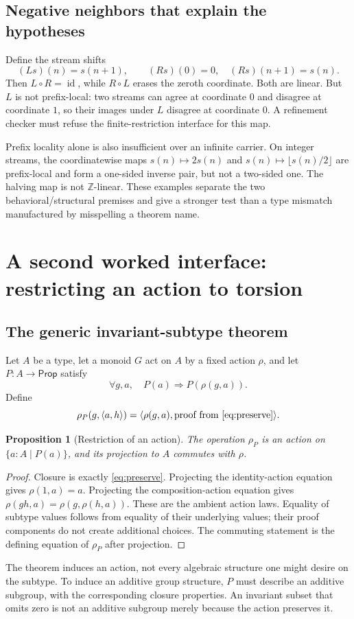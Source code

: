 \documentclass[11pt,a4paper]{article}
\newcommand{\Z}{\mathbb Z}
\newcommand{\id}{\operatorname{id}}
\newcommand{\Prop}{\mathsf{Prop}}
\theoremstyle{plain}
\newtheorem{proposition}[theorem]{Proposition}
\theoremstyle{definition}
\begin{document}
\subsection{Negative neighbors that explain the hypotheses}
Define the stream shifts
\[
 (Ls)(n)=s(n+1),\qquad
 (Rs)(0)=0,\quad (Rs)(n+1)=s(n).
\]
Then $L\circ R=\id$, while $R\circ L$ erases the zeroth coordinate. Both are linear. But $L$ is not prefix-local: two streams can agree at coordinate $0$ and disagree at coordinate $1$, so their images under $L$ disagree at coordinate $0$. A refinement checker must refuse the finite-restriction interface for this map.

Prefix locality alone is also insufficient over an infinite carrier. On integer streams, the coordinatewise maps $s(n)\mapsto 2s(n)$ and $s(n)\mapsto\lfloor s(n)/2\rfloor$ are prefix-local and form a one-sided inverse pair, but not a two-sided one. The halving map is not $\Z$-linear. These examples separate the two behavioral/structural premises and give a stronger test than a type mismatch manufactured by misspelling a theorem name.

\section{A second worked interface: restricting an action to torsion}\label{sec:torsion}

\subsection{The generic invariant-subtype theorem}
Let $A$ be a type, let a monoid $G$ act on $A$ by a fixed action $\rho$, and let $P:A\to\Prop$ satisfy
\begin{equation}
 \forall g,a,\quad P(a)\Longrightarrow P(\rho(g,a)).\label{eq:preserve}
\end{equation}
Define
\[
 \rho_P(g,\langle a,h\rangle)
     =\langle\rho(g,a),\text{proof from \eqref{eq:preserve}}\rangle.
\]

\begin{proposition}[Restriction of an action]
The operation $\rho_P$ is an action on $\{a:A\mid P(a)\}$, and its projection to $A$ commutes with $\rho$.
\end{proposition}
\begin{proof}
Closure is exactly \eqref{eq:preserve}. Projecting the identity-action equation gives $\rho(1,a)=a$. Projecting the composition-action equation gives
$\rho(gh,a)=\rho(g,\rho(h,a))$. These are the ambient action laws. Equality of subtype values follows from equality of their underlying values; their proof components do not create additional choices. The commuting statement is the defining equation of $\rho_P$ after projection.
\end{proof}
The theorem induces an action, not every algebraic structure one might desire on the subtype. To induce an additive group structure, $P$ must describe an additive subgroup, with the corresponding closure properties. An invariant subset that omits zero is not an additive subgroup merely because the action preserves it.
\end{document}

